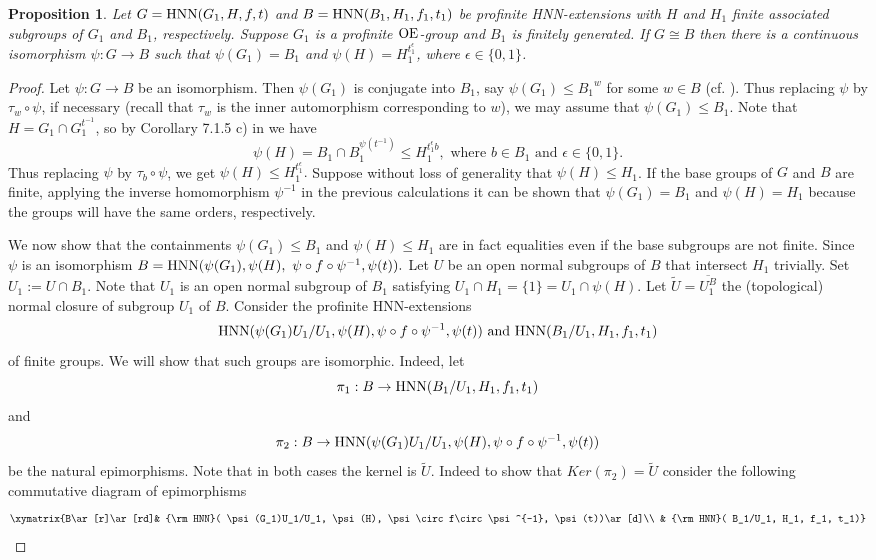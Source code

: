 \documentclass[a4paper,12pt]{article}
\newtheorem{prop}[thm]{Proposition}
\def\OE{{\rm OE}}
\def\hnn {{\rm HNN}}
\begin{document}
{\begin{prop} \label{profinito normal iso} Let $G = \hnn(G_{1}, H,f,t)$ and $B = \hnn(B_{1}, H_1,f_1,t_1)$ be profinite HNN-extensions  with $H$ and $H_1$ finite associated subgroups of $G_1$ and $B_1$, respectively. Suppose $G_1$ is a profinite $\OE$-group and $B_1$ is finitely generated. If $G\cong B$ then there is a continuous isomorphism $\psi: G \longrightarrow B$ such that $\psi(G_1)= B_1$ and $\psi(H)= H_1^{t_1^{\epsilon}}$, where $ \epsilon \in \{0,1\}$.
\end{prop}

\begin{proof} Let $\psi: G\rightarrow  B$ be an isomorphism. Then $\psi(G_1)$ is conjugate into $B_1$, say $\psi(G_1)\leqslant {B_{1}}^{w}$ for some $w\in B$ (cf. \cite[Example 6.3.1]{R}). Thus replacing $\psi$ by $\tau_{w} \circ \psi$, if necessary (recall that $\tau_w$ is the inner  automorphism corresponding to $w$), we may assume that $\psi(G_1) \leqslant B_1$.  
Note that $H=G_1\cap G_1^{t^{-1}}$, so by Corollary 7.1.5 c) in \cite{R} we have $$\psi(H) = B_{1} \cap  B_{1}^{\psi(t^{-1})} \leqslant H_1^{t_1^{\epsilon}b}, \mbox{ where } b\in B_1 \mbox{ and } \epsilon \in \{0,1\}.$$ Thus replacing $\psi$ by $\tau_{b} \circ \psi$,  we get $\psi(H) \leq H_1^{t_1^{\epsilon}}.$ Suppose without loss of generality that $\psi(H) \leq H_1$. If the base groups of $G$ and $B$ are finite, applying the inverse homomorphism $\psi^{-1}$ in the previous calculations it can be shown that $\psi(G_1)=B_1$ and $\psi(H)=H_1$ because the groups will have the same orders, respectively. 

We now show that the containments $\psi(G_1) \leqslant B_1$ and $\psi(H) \leqslant H_1$ are in fact equalities even if the base subgroups are not finite. 
Since $\psi$ is an isomorphism $B=\hnn(\psi(G_{1}),  \psi(H), \ \psi \circ f\circ \psi^{-1}, \psi(t)  ).$ Let $U$ be an open normal subgroups of $B$ that intersect $H_1$  trivially. 
Set $U_1 := U \cap B_1$. Note that  $U_1$ is an open normal subgroup of $B_1$ satisfying $U_1 \cap H_1 =\{1\}=U_1 \cap \psi(H).$    
Let $\widetilde U= \overline{  U_{1}^{B}}$ the (topological) normal closure of subgroup $ U_1$ of $B.$ Consider the profinite HNN-extensions  $$\hnn( \psi(G_1)U_1/U_1,  \psi(H),  \psi \circ f\circ \psi^{-1}, \psi(t))\  {\rm and}\  \hnn( B_1/U_1,  H_1,  f_1, t_1)$$ of finite groups. We will show that such groups are isomorphic. Indeed, let $$\pi_1: B \rightarrow \hnn( B_1/U_1,  H_1,  f_1, t_1)$$ and $$\pi_2: B \rightarrow \hnn( \psi(G_1)U_1/U_1,  \psi(H),  \psi \circ f\circ \psi^{-1}, \psi(t))$$ be the natural epimorphisms. Note that in both cases the kernel is $\widetilde U$. Indeed to show that $Ker(\pi_2)=\widetilde U$ consider the following commutative diagram of epimorphisms
$$\xymatrix{B\ar[r]\ar[rd]& \hnn( \psi(G_1)U_1/U_1,  \psi(H),  \psi \circ f\circ \psi^{-1}, \psi(t))\ar[d]\\
& \hnn( B_1/U_1,  H_1,  f_1, t_1)}$$


\end{proof}}
\end{document}
